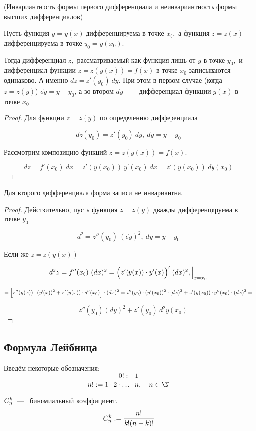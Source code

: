 \begin{theorem}
	\hypertarget{thrm5.7}{(Инвариантность формы первого дифференциала и неинвариантность формы высших дифференциалов)} Пусть функция $y = y(x)$ дифференцируема в точке $x_{0},$ а функция $z = z(x)$ дифференцируема в точке $y_{0} = y(x_{0}).$
	
	Тогда дифференциал $z,$ рассматриваемый как функция лишь от $y$ в точке $y_{0},$  и дифференциал функции $z= z(y(x)) = f(x)$ в точке $x_{0}$ записываются одинаково. А именно $dz = z'(y_{0}) \ dy$. При этом в первом случае (когда $z=z(y)$) $dy = y-y_{0}$, а во втором $dy$~---~ дифференциал функции $y(x)$ в точке $x_{0}$
\end{theorem}
\begin{proof}
	Для функции $z = z(y)$ по определению дифференциала 
	
	$$dz(y_{0}) = z'(y_{0}) \ dy, \ dy = y-y_{0}$$
	
	Рассмотрим композицию функций $z = z(y(x)) = f(x)$.
	
	$$dz = f'(x_{0}) \ dx = z'(y(x_{0})) \ y'(x_{0}) \ dx = z'(y(x_{0})) \ dy(x_{0})$$
\end{proof}

\begin{note}
	Для второго дифференциала форма записи не инвариантна.
\end{note}
\begin{proof}
	Действительно, пусть функция $z = z(y)$ дважды дифференцируема в точке $y_{0}$
	
	$$d^{2} = z''(y_{0}) \ (dy)^{2}, \ dy = y-y_{0}$$
	
	Если же $z = z(y(x))$
	
	$$d^{2} z = f''(x_{0}) \ (dx)^{2} = \Bigl( z'(y(x)) \cdot y'(x) \Bigr)' \ (dx)^{2}, \Big|_{x = x_{0}}
	$$
	
	$$
	= \Bigl[z''(y(x)) \cdot (y'(x))^{2} + z'(y(x))\cdot y''(x_{0}) \Bigr] \cdot (dx)^{2} = z''(y_{0}) \cdot (y'(x_{0}))^{2} \cdot (dx)^{2} + z'(y(x_{0})) \cdot y''(x_{0}) \cdot (dx)^{2} =$$
	
	$$
	= z''(y_{0}) (dy)^2 + z'(y_{0}) \ d^{2} y(x_{0})
	$$
\end{proof}

\subsection{Формула Лейбница}
Введём некоторые обозначения: 
$$0! :=1$$
$$ n! := 1 \cdot 2 \cdot \ldots \cdot n, \quad n \in \N $$

$ \relax C_{n}^{k}$~---~ биномиальный коэффициент.
$$ \relax C_{n}^{k} := \cfrac{n!}{k!(n-k)!}$$

